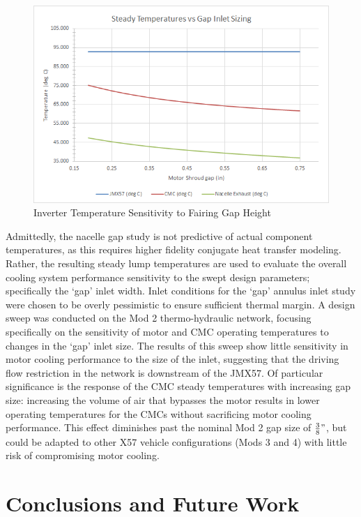 \documentclass[]{aiaa-tc}%
\begin{document}
\begin{figure}[!htb]%
	\centering
	\includegraphics[width=.75\textwidth]{figures/gapsweep_results.png}
	\caption{Inverter Temperature Sensitivity to Fairing Gap Height}
	\label{fig:GapSweep}
\end{figure}

Admittedly, the nacelle gap study is not predictive of actual component temperatures, as this requires higher fidelity conjugate heat transfer modeling.  Rather, the resulting steady lump temperatures are used to evaluate the overall cooling system performance sensitivity to the swept design parameters; specifically the `gap' inlet width.  Inlet conditions for the `gap' annulus inlet study were chosen to be overly pessimistic to ensure sufficient thermal margin. 
A design sweep was conducted on the Mod 2 thermo-hydraulic network, focusing specifically on the sensitivity of motor and CMC operating temperatures to changes in the `gap' inlet size.  
The results of this sweep show little sensitivity in motor cooling performance to the size of the inlet, suggesting that the driving flow restriction in the network is downstream of the JMX57.  Of particular significance is the response of the CMC steady temperatures with increasing gap size:  increasing the volume of air that bypasses the motor results in lower operating temperatures for the CMCs without sacrificing motor cooling performance.  This effect diminishes past the nominal Mod 2 gap size of $\frac{3}{8}"$, but could be adapted to other X57 vehicle configurations (Mods 3 and 4) with little risk of compromising motor cooling.


\section{Conclusions and Future Work}
\end{document}

